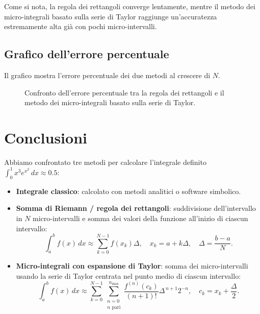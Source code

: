 \documentclass[10pt]{extarticle}
\begin{document}
Come si nota, la regola dei rettangoli converge lentamente, mentre il metodo dei micro-integrali basato sulla serie di Taylor raggiunge un’accuratezza estremamente alta già con pochi micro-intervalli.
\subsection{Grafico dell'errore percentuale}
Il grafico mostra l'errore percentuale dei due metodi al crescere di $N$.

\begin{figure}[h!]
\centering
{}
\caption{Confronto dell'errore percentuale tra la regola dei rettangoli e il metodo dei micro-integrali basato sulla serie di Taylor.}
\end{figure}
\section{Conclusioni}

Abbiamo confrontato tre metodi per calcolare l'integrale definito
\(\int_0^1 x^3 e^{x^2} \, dx \approx 0.5\):

\begin{itemize}
    \item \textbf{Integrale classico}: calcolato con metodi analitici o software simbolico.
    \item \textbf{Somma di Riemann / regola dei rettangoli}: suddivisione dell'intervallo in \(N\) micro-intervalli e somma dei valori della funzione all'inizio di ciascun intervallo:
    \[
    \int_a^b f(x) \, dx \approx \sum_{k=0}^{N-1} f(x_k) \Delta, \quad x_k = a + k \Delta, \quad \Delta = \frac{b-a}{N}.
    \]
    \item \textbf{Micro-integrali con espansione di Taylor}: somma dei micro-intervalli usando la serie di Taylor centrata nel punto medio di ciascun intervallo:
    \[
    \int_a^b f(x) \, dx \approx \sum_{k=0}^{N-1} \sum_{\substack{n=0 \\ n \text{ pari}}}^{n_\text{max}} 
    \frac{f^{(n)}(c_k)}{(n+1)!} \Delta^{\,n+1} 2^{-n}, \quad 
    c_k = x_k + \frac{\Delta}{2}.
    \]
\end{itemize}
\end{document}
